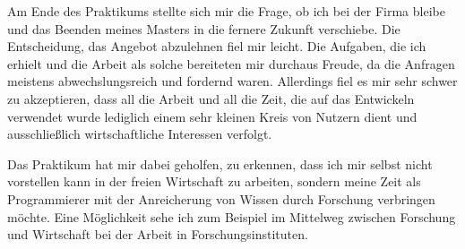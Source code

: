 \documentclass[a4paper, 11pt]{article}
\begin{document}
Am Ende des Praktikums stellte sich mir die Frage, ob ich bei der Firma bleibe und das Beenden meines Masters in die fernere Zukunft verschiebe. Die Entscheidung, das Angebot abzulehnen fiel mir leicht. Die Aufgaben, die ich erhielt und die Arbeit als solche bereiteten mir durchaus Freude, da die Anfragen meistens abwechslungsreich und fordernd waren. Allerdings fiel es mir sehr schwer zu akzeptieren, dass all die Arbeit und all die Zeit, die auf das Entwickeln verwendet wurde lediglich einem sehr kleinen Kreis von Nutzern dient und ausschließlich wirtschaftliche Interessen verfolgt. 

Das Praktikum hat mir dabei geholfen, zu erkennen, dass ich mir selbst nicht vorstellen kann in der freien Wirtschaft zu arbeiten, sondern meine Zeit als Programmierer mit der Anreicherung von Wissen durch Forschung verbringen möchte. Eine Möglichkeit sehe ich zum Beispiel im Mittelweg zwischen Forschung und Wirtschaft bei der Arbeit in Forschungsinstituten.
\end{document}
